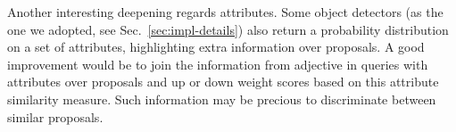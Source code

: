 Another interesting deepening regards attributes. Some object
detectors (as the one we adopted, see Sec.~\ref{sec:impl-details})
also return a probability distribution on a set of attributes,
highlighting extra information over proposals. A good improvement
would be to join the information from adjective in queries with
attributes over proposals and up or down weight scores based on this
attribute similarity measure. Such information may be precious to
discriminate between similar proposals.
